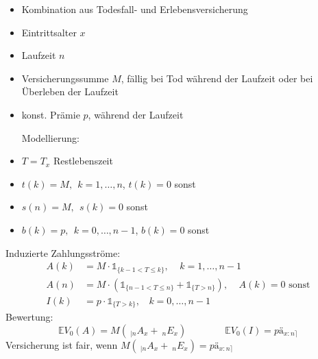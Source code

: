 \begin{enumerate}[(a)]
	\begin{minipage}[t]{9cm}
		\begin{itemize}
			\item Kombination aus Todesfall- und Erlebensversicherung
			\item Eintrittsalter $x$
			\item Laufzeit $n$
			\item Versicherungssumme $M$, fällig bei Tod während der Laufzeit oder bei Überleben der Laufzeit
			\item konst. Prämie $p$, während der Laufzeit
		\end{itemize}
	\end{minipage}
	\begin{minipage}[t]{9cm}
		\begin{itemize}
			\item[Modellierung:]
			\item $T=T_x$ Restlebenszeit
			\item $t(k)=M,~~ k=1,\dots,n$, $t(k)=0$ sonst
			\item $s(n)=M,~~ s(k)=0$ sonst
			\item $b(k)=p,~~ k=0,\dots,n-1$, $b(k)=0$ sonst
		\end{itemize}
	\end{minipage}
	Induzierte Zahlungsströme:
	\begin{equation*}
	\begin{aligned}
		A(k) &= M\cdot \mathbb{1}_{\{k-1<T\le k \}}, ~~~~~k=1,\dots,n-1\\
		A(n) &= M\cdot (\mathbb{1}_{\{n-1<T \le n \}}+\mathbb{1}_{\{T>n\}}), ~~~~~A(k)=0 \text{ sonst}\\
		I(k) &= p\cdot \mathbb{1}_{\{T>k\}},~~~~k=0,\dots,n-1
	\end{aligned}
	\end{equation*}
	Bewertung: 
	\[ 
	\mathds{E}V_0(A)=M(~_{|n}A_x + ~_nE_x) \qquad \qquad \mathds{E}V_0(I)=p ä_{x:n\rceil}
	\]
	Versicherung ist fair, wenn $M(~_{|n}A_x + ~_nE_x)=p ä_{x:n\rceil}$
\end{enumerate}

